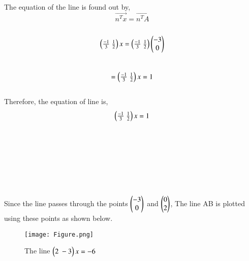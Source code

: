 \documentclass[journal,12pt,twocolumn]{IEEEtran}
\begin{document}
\\
The equation of the line is found out by,
\begin{equation}
\vec{n^Tx} = \vec{n^TA}
\end{equation}
\\
\begin{equation}
\begin{pmatrix}\frac{-1}{3}\ \frac{1}{2}\end{pmatrix}x =  \begin{pmatrix}\frac{-1}{3}\ \frac{1}{2}\end{pmatrix}\begin{pmatrix}-3 \\ 0\end{pmatrix}
\end{equation}
\\
\begin{equation}
= \begin{pmatrix}\frac{-1}{3}\ \frac{1}{2}\end{pmatrix}x = 1
\end{equation}
\\
 Therefore, the equation of line is,
\begin{equation}
  \begin{pmatrix}\frac{-1}{3}\ \frac{1}{2}\end{pmatrix}x = 1
\end{equation}
\\
\\
\\
\\
\\
\\
\\
Since the line passes through the points $\begin{pmatrix}-3\\0\end{pmatrix}$ and $\begin{pmatrix}0\\2\end{pmatrix}$, The line AB is plotted using these points as shown below.


\begin{figure}[!h]
         \centering
         \texttt{[image: Figure.png]}
         \caption{The line $\begin{pmatrix}2 \ -3\end{pmatrix}x  = -6$ }
         \label{Figure}
\end{figure}
\end{document}
